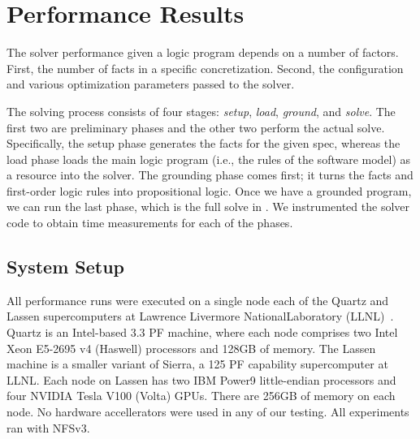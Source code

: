 \section{Performance Results}
\label{sec:perf-results}


The \clingo{} solver performance given a logic program depends on a number of factors.
First, the number of facts in a specific concretization. Second, the configuration and
various optimization parameters passed to the solver.

The solving process consists of four stages: \emph{setup}, \emph{load}, \emph{ground},
and \emph{solve}. The first two are preliminary phases and the other two perform the
actual solve. Specifically, the setup phase generates the facts for the given spec,
whereas the load phase loads the main logic program (i.e., the rules of the software
model) as a resource into the solver. The grounding phase comes first; it turns the
facts and first-order logic rules into propositional logic. Once we have a grounded
program, we can run the last phase, which is the full solve in \clingo{}.
%
We instrumented the solver code to obtain time measurements for each of the
phases.

% 

% 



\subsection{System Setup}

All performance runs were executed on a single node each of the Quartz and Lassen
supercomputers at Lawrence Livermore NationalLaboratory (LLNL)~\cite{llnl:hpc}. Quartz
is an Intel-based 3.3 PF machine, where each node comprises two Intel Xeon E5-2695 v4
(Haswell) processors and 128GB of memory. The Lassen machine is a smaller variant of
Sierra, a 125 PF capability supercomputer at LLNL. Each node on Lassen has two IBM
Power9 little-endian processors and four NVIDIA Tesla V100 (Volta) GPUs. There are 256GB
of memory on each node. No hardware accellerators were used in any of our testing. All
experiments ran with NFSv3.

